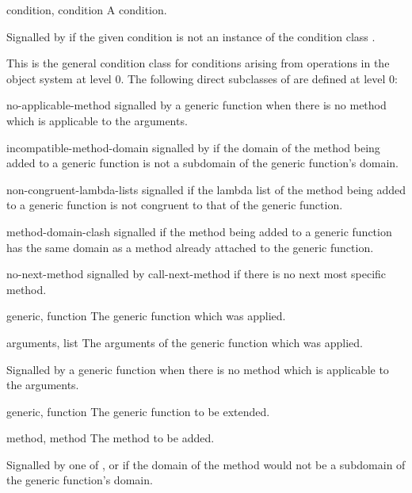 \begin{optDefinition}
%
\begin{initoptions}
    \item[condition, condition] A condition.
\end{initoptions}
%
Signalled by  if the given condition is not an instance of
the condition class .

%
This is the general condition class for conditions arising from operations in
the object system at level 0. The following direct subclasses of
 are defined at level 0:
%
\begin{subclasses}
    \item[no-applicable-method] signalled by a generic function when there is
    no method which is applicable to the arguments.
    \item[incompatible-method-domain] signalled by if the domain of the method
    being added to a generic function is not a subdomain of the generic
    function's domain.
    \item[non-congruent-lambda-lists] signalled if the lambda list of the
    method being added to a generic function is not congruent to that of the
    generic function.
    \item[method-domain-clash] signalled if the method being added to a
    generic function has the same domain as a method already attached to the
    generic function.
    \item[no-next-method] signalled by call-next-method if there is no next
    most specific method.
\end{subclasses}
%
%
\begin{initoptions}
    \item[generic, function] The generic function which was applied.
    \item[arguments, list] The arguments of the generic function which was
    applied.
\end{initoptions}
%
\remarks%
Signalled by a generic function when there is no method which is applicable to
the arguments.

%
\begin{initoptions}
    \item[generic, function] The generic function to be extended.
    \item[method, method] The method to be added.
\end{initoptions}
%
\remarks%
Signalled by one of ,  or
 if the domain of the method would not be a subdomain
of the generic function's domain.


\end{optDefinition}
